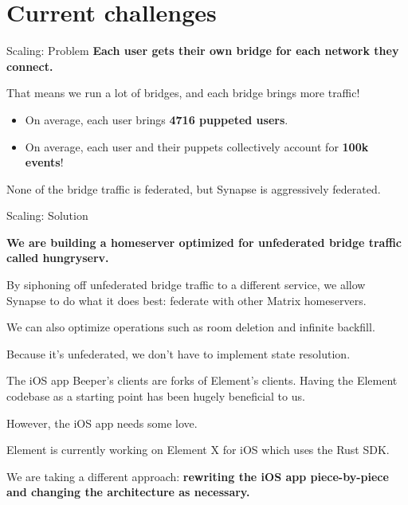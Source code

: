 \documentclass{beeper}
\begin{document}
\section{Current challenges}

\begin{frame}{Scaling: Problem}
    \textbf{Each user gets their own bridge for each network they connect.}

    That means we run a lot of bridges, and each bridge brings more traffic!
    \pause

    \begin{itemize}
        \item On average, each user brings \textbf{4716 puppeted users}.
        \item On average, each user and their puppets collectively account for
            \textbf{100k events}!
    \end{itemize}

    \pause
    None of the bridge traffic is federated, but Synapse is aggressively
    federated.
\end{frame}

\begin{frame}{Scaling: Solution}
    \begin{center}
        \textbf{We are building a homeserver optimized for unfederated bridge
        traffic called hungryserv.}
    \end{center}
    \vspace{1cm}
    \pause

    By siphoning off unfederated bridge traffic to a different service, we allow
    Synapse to do what it does best: federate with other Matrix homeservers.
    \pause

    We can also optimize operations such as room deletion and infinite backfill.

    Because it's unfederated, we don't have to implement state resolution.
\end{frame}

\begin{frame}{The iOS app}
    Beeper's clients are forks of Element's clients. Having the Element
    codebase as a starting point has been hugely beneficial to us.
    \pause

    However, the iOS app needs some love.
    \vspace{1cm}
    \pause

    Element is currently working on Element X for iOS which uses the Rust SDK.

    We are taking a different approach: \textbf{rewriting the iOS app
    piece-by-piece and changing the architecture as necessary.}
\end{frame}
\end{document}
